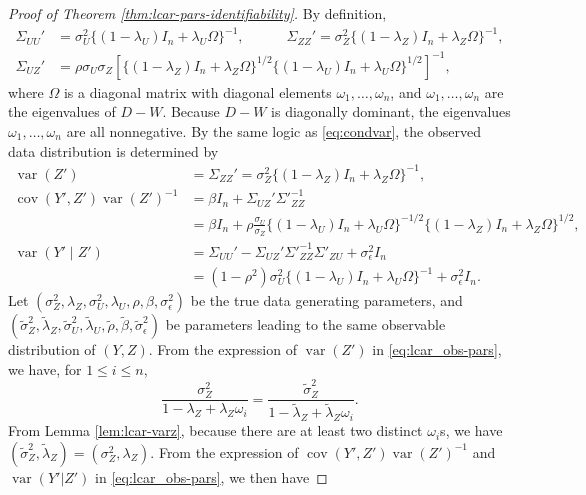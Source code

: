 \documentclass[11pt]{article}
\theoremstyle{definition}
\theoremstyle{remark}
\DeclareMathOperator{\var}{var}
\DeclareMathOperator{\cov}{cov}
\begin{document}
\begin{proof}[Proof of Theorem \ref{thm:lcar-pars-identifiability}] 
By definition, 
\begin{align*}
    \Sigma_{UU}' & = \sigma_U^2 \{ (1-\lambda_U) I_n + \lambda_U \Omega \}^{-1}, 
    \qquad \quad 
    \Sigma_{ZZ}' = \sigma_Z^2 \{ (1-\lambda_Z) I_n + \lambda_Z \Omega \}^{-1}, \\
    \Sigma_{UZ}' & = \rho\sigma_U\sigma_Z \left[\{(1-\lambda_Z)I_n+\lambda_Z \Omega\}^{1/2}\{(1-\lambda_U)I_n + \lambda_U\Omega\}^{1/2}\right]^{-1}, 
\end{align*}
where $\Omega$ is a diagonal matrix with diagonal elements $\omega_1, \ldots, \omega_n$, and $\omega_1, \ldots, \omega_n$ are the eigenvalues of $D-W$. 
Because $D-W$ is diagonally dominant, the eigenvalues $\omega_1, \ldots, \omega_n$ are all nonnegative. 
By the same logic as \eqref{eq:condvar}, the observed data distribution is determined by 
\begin{align}\label{eq:lcar_obs-pars}
    \var(Z') & = \Sigma_{ZZ}'
    = \sigma_Z^2 \{ (1-\lambda_Z) I_n + \lambda_Z \Omega \}^{-1}, 
    \nonumber\\
    \cov(Y', Z') \var(Z')^{-1} & = \beta I_n + \Sigma_{UZ}' \Sigma'^{-1}_{ZZ}
    \nonumber
    \\
    & =\beta I_n + \rho \frac{\sigma_U}{ \sigma_Z} \{ (1-\lambda_{U} )I_n + \lambda_{U} \Omega \}^{-1/2} \{ (1-\lambda_Z) I_n + \lambda_Z \Omega \}^{1/2},
    \nonumber
    \\
    \var(Y' \mid Z') & = \Sigma_{UU}' - \Sigma_{UZ}' \Sigma'^{-1}_{ZZ} \Sigma'_{ZU} + \sigma_{\epsilon}^2 I_n
    \nonumber
    \\
    & = 
    (1-\rho^2) \sigma_U^2 \{ (1-\lambda_{U} )I_n + \lambda_{U} \Omega \}^{-1} 
    + \sigma_{\epsilon}^2 I_n. 
\end{align}
Let $(\sigma_Z^2, \lambda_Z, \sigma_U^2, \lambda_U, \rho, \beta, \sigma_\epsilon^2)$ be the true data generating parameters, 
and $(\tilde\sigma_Z^2, \tilde\lambda_Z, \tilde\sigma_U^2, \allowbreak\tilde\lambda_U, \tilde\rho, \tilde\beta, \tilde\sigma_\epsilon^2)$ be parameters leading to the same observable distribution of $(Y, Z)$. 
From the expression of $\var(Z')$ in \eqref{eq:lcar_obs-pars}, we have, for $1\le i \le n$, 
\begin{equation}\nonumber%
\frac{\sigma_Z^2}{1-\lambda_Z+\lambda_Z\omega_i} = \frac{\tilde\sigma_Z^2}{1-\tilde\lambda_Z+\tilde\lambda_Z\omega_i}. 
\end{equation} From Lemma \ref{lem:lcar-varz}, because there are at least two distinct $\omega_i$s, we have $(\tilde\sigma_Z^2, \tilde\lambda_Z) = (\sigma_Z^2, \lambda_Z)$. From the expression of  $\cov(Y', Z') \var(Z')^{-1}$ and $\var(Y'|Z')$ in \eqref{eq:lcar_obs-pars}, we then have

\end{proof}
\end{document}
